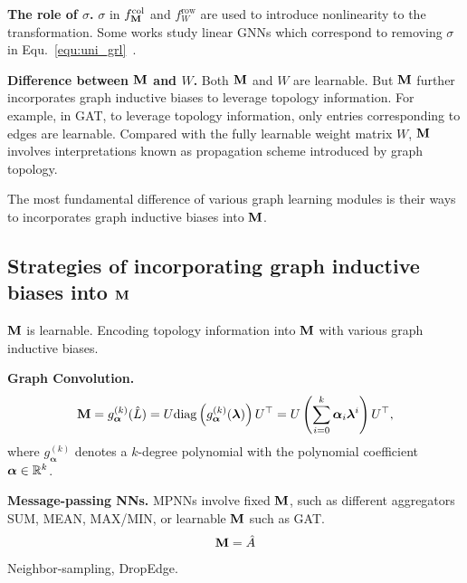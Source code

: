 \documentclass{article} %
\def\valpha{{\bm\alpha}}
\def\vlambda{{\bm\lambda}}
\begin{document}
\textbf{The role of $\sigma$.}
$\sigma$ in $f_{{\mathbf{M}}}^{\mathrm{col}}$ and $f_W^{\mathrm{row}}$ are used to introduce nonlinearity to the transformation.
Some works study linear GNNs which correspond to removing $\sigma$ in Equ.~\ref{equ:uni_grl}~\citep{pmlr-v97-wu19e,xu2021optimization,JacobiConv,liu2021eignn,liu2022mgnni}.

\textbf{Difference between ${\mathbf{M}}$ and $W$.}
Both ${\mathbf{M}}$ and $W$ are learnable.
But ${\mathbf{M}}$ further incorporates graph inductive biases to leverage topology information.
For example, in GAT, to leverage topology information, only entries corresponding to edges are learnable.
Compared with the fully learnable weight matrix $W$, ${\mathbf{M}}$ involves interpretations known as propagation scheme introduced by graph topology.

The most fundamental difference of various graph learning modules is their ways to incorporates graph inductive biases into ${\mathbf{M}}$.

\subsection{Strategies of incorporating graph inductive biases into ${\mathbf{M}}$}

${\mathbf{M}}$ is learnable.
Encoding topology information into ${\mathbf{M}}$ with various graph inductive biases.

\textbf{Graph Convolution.}
\begin{equation}
	\begin{aligned}
		\rmM=g_{\valpha}^{(k)}(\hat L)=U\mathrm{diag}\left(g_{\valpha}^{(k)}(\vlambda)\right)U^{\top}=U\left(\sum_{i=0}^k\valpha_i\vlambda^i\right)U^{\top},
	\end{aligned}
\end{equation}
where $g_{\valpha}^{(k)}$ denotes a $k$-degree polynomial with the polynomial coefficient $\valpha\in\sR^k$.

\textbf{Message-passing NNs.}
MPNNs involve fixed ${\mathbf{M}}$, such as different aggregators SUM, MEAN, MAX/MIN, or learnable ${\mathbf{M}}$ such as GAT.
\begin{equation}
	\begin{aligned}
		{\mathbf{M}}=\hat A
	\end{aligned}
\end{equation}
Neighbor-sampling, DropEdge.
\end{document}
